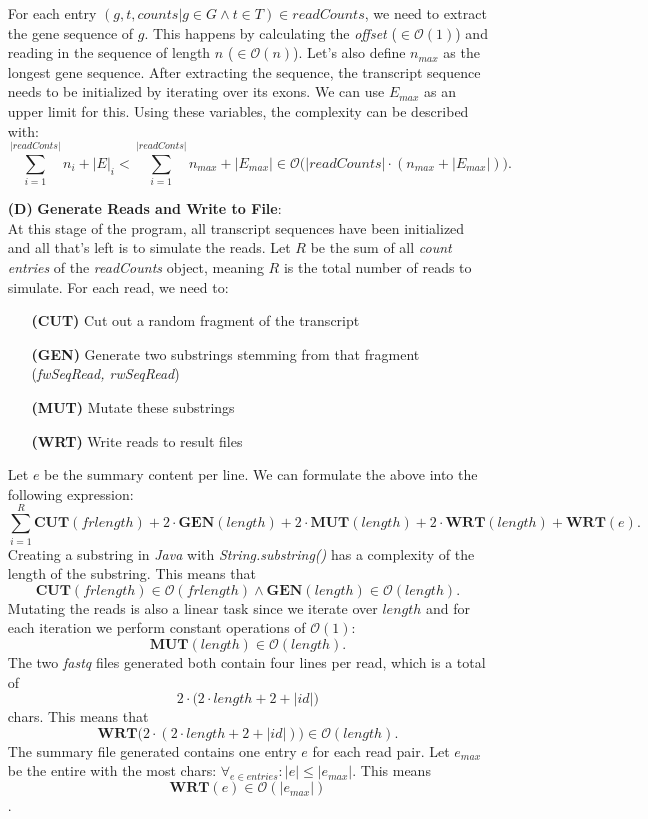 \documentclass[12pt]{article}
\begin{document}
\begin{enumerate}
        For each entry $(g, t, counts | g \in G \land t \in T) \in readCounts$, we need to extract the gene sequence of $g$.
        This happens by calculating the \textit{offset} ($\in \mathcal{O}(1)$) and reading in the sequence of length $n$ ($\in \mathcal{O}(n)$).
        Let's also define $n_{max}$ as the longest gene sequence.
        After extracting the sequence, the transcript sequence needs to be initialized by iterating over its exons.
        We can use $E_{max}$ as an upper limit for this.
        Using these variables, the complexity can be described with:
        \[
            \sum_{i=1}^{|readConts|} n_{i} + |E|_{i} < \sum_{i=1}^{|readConts|} n_{max} + |E_{max}| \in \mathcal{O}\Big(|readCounts| \cdot (n_{max} + |E_{max}|)\Big)
        .\]
    \item[\textbf{(D)}] \textbf{Generate Reads and Write to File}:\\
        At this stage of the program, all transcript sequences have been initialized and all that's left is to simulate the reads.
        Let $R$ be the sum of all \textit{count entries} of the \textit{readCounts} object, meaning $R$ is the total number of reads to 
        simulate. For each read, we need to:
        \begin{enumerate}
            \item[\textbf{(CUT)}] Cut out a random fragment of the transcript
            \item[\textbf{(GEN)}] Generate two substrings stemming from that fragment (\textit{fwSeqRead, rwSeqRead})
            \item[\textbf{(MUT)}] Mutate these substrings
            \item[\textbf{(WRT)}] Write reads to result files
        \end{enumerate}
        Let $e$ be the summary content per line. We can formulate the above into the following expression:
        \[
            \sum_{i=1}^{R} \mathbf{CUT}(frlength) + 2 \cdot \mathbf{GEN}(length) + 2 \cdot \mathbf{MUT}(length) + 2 \cdot \mathbf{WRT}(length) + \mathbf{WRT}(e)
        .\]
        Creating a substring in \textit{Java} with \textit{String.substring()} has a complexity of the length of the substring.
        This means that 
        \[
        \mathbf{CUT}(frlength) \in \mathcal{O}(frlength) \land \mathbf{GEN}(length) \in \mathcal{O}(length)
        .\]
        Mutating the reads is also a linear task since we iterate over $length$ and for each iteration we perform 
        constant operations of $\mathcal{O}(1)$:
        \[
           \mathbf{MUT}(length) \in \mathcal{O}(length)
        .\]
        The two \textit{fastq} files generated both contain four lines per read, which is a total of
        \[
            2 \cdot \big(2 \cdot length + 2 + |id|\big)
        \]
        chars. This means that 
        \[
            \mathbf{WRT}\big(2 \cdot (2 \cdot length + 2 + |id|)\big) \in \mathcal{O}(length)
        .\]
        The summary file generated contains one entry $e$ for each read pair. Let $e_{max}$ be the entire with the most chars: $\forall_{e \in entries}: |e| \le |e_{max}|$.
        This means 
        \[
            \mathbf{WRT}(e) \in \mathcal{O}(|e_{max}|)
        \].


\end{enumerate}
\end{document}
